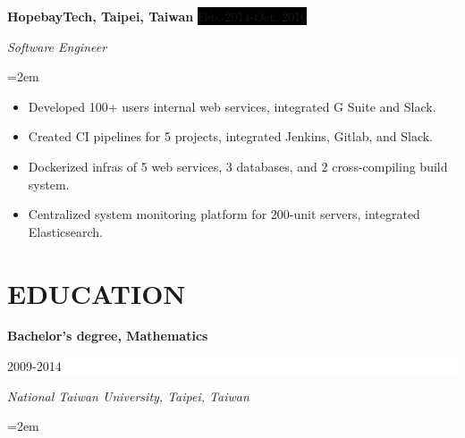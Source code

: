 \documentclass[a4paper, 11pt]{article}
\newcommand{\sepspace}{\vspace*{1em}}		%
\newcommand{\NewPart}[1]{\section*{\uppercase{#1}}}
\newcommand{\EducationEntry}[4]{
		\noindent \textbf{#1} \hfill      %
		\colorbox{White}{%
			\parbox{5cm}{%
			\hfill\color{Black}#2}} \par  %
		\noindent \textit{#3} \par        %
		\noindent\hangindent=2em\hangafter=0 \small #4 %
		\normalsize \par}
\newcommand{\WorkEntry}[4]{				  %
		\noindent \textbf{#1} \hfill      %
		\noindent\colorbox{Black}{\color{White}#2} \par  %
		\noindent \textit{#3} \par              %
		\noindent\hangindent=2em\hangafter=0 \small #4 %
		\normalsize \par}
\begin{document}
\sepspace

\WorkEntry{HopebayTech, Taipei, Taiwan}{Feb. 2014-Oct. 2016}{Software Engineer}{
\begin{itemize}
	\item {Developed 100+ users internal web services, integrated G Suite and Slack.}
	\item {Created CI pipelines for 5 projects, integrated Jenkins, Gitlab, and Slack.}
	\item {Dockerized infras of 5 web services, 3 databases, and 2 cross-compiling build system.}
	\item {Centralized system monitoring platform for 200-unit servers, integrated Elasticsearch.}
\end{itemize}
}

\NewPart{Education}{}

\EducationEntry{Bachelor's degree, Mathematics}{2009-2014}
{National Taiwan University, Taipei, Taiwan}{}


\end{document}
